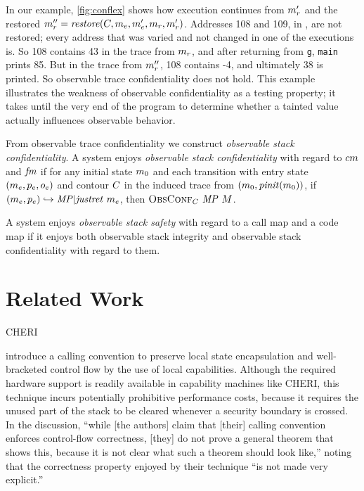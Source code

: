 \documentclass[acmsmall,review,anonymous]{acmart}\settopmatter{printfolios=true,printccs=false,printacmref=false}
\begin{document}
      In our example, \cref{fig:conflex} shows how execution continues from
      \(m_r'\) and the restored \(m_r'' = \mathit{restore}(C,
      m_e,m_e',m_r,m_r')\). Addresses 108 and 109, in \tainted,
      are not restored; every address that was varied and not changed in one
      of the executions is. So 108 contains 43 in the trace from \(m_r\),
      and after returning from {\tt g}, {\tt main} prints 85. But in the trace
      from \(m_r''\), 108 contains -4, and ultimately 38 is printed.
      So observable trace confidentiality does not hold. This example
      illustrates the weakness of observable confidentiality as a testing
      property; it takes until the very end of the program to determine whether
      a tainted value actually influences observable behavior.


      From observable trace confidentiality we construct {\em observable stack
      confidentiality}. A system enjoys {\em observable stack confidentiality}
      with regard to \(cm\) and \(\mathit{fm}\) if for any initial state
      \(m_0\) and each transition with entry state
      \((m_e,p_e,o_e)\) and contour \(C\) in the
      induced trace from \((m_0,\mathit{pinit}(m_0))\), if
      \((m_e,p_e) \hookrightarrow \mathit{MP} | \mathit{justret}\ m_e\),
      then \(\text{\sc ObsConf}_C ~ \mathit{MP} ~ M\).

      A system enjoys {\em observable stack safety} with regard to a call map
      and a code map if it enjoys both observable stack integrity and
      observable stack confidentiality with regard to them.

\section{Related Work}
\label{sec:relwork}

CHERI 

\citet{Skorstengaard+19b} introduce a calling convention to preserve local state
encapsulation and well-bracketed control flow by the use of local capabilities.
Although the required hardware support is readily available in capability
machines like CHERI, this technique incurs potentially prohibitive performance
costs, because it requires the unused part of the stack to be cleared whenever a
security boundary is crossed. In the discussion, ``while [the authors] claim
that [their] calling convention enforces control-flow correctness, [they] do not
prove a general theorem that shows this, because it is not clear what such a
theorem should look like,'' noting that the correctness property enjoyed by
their technique ``is not made very explicit.''
\end{document}
